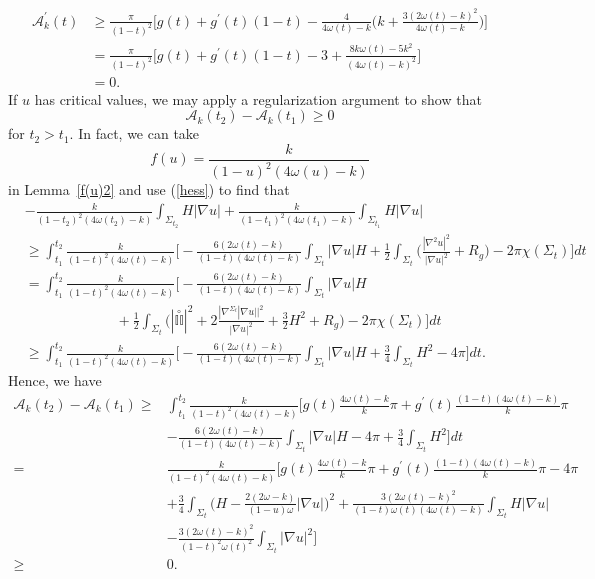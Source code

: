\documentclass[12pt]{article}
\theoremstyle{definition}
\theoremstyle{plain}
\numberwithin{equation}{section}
\begin{document}
$$
\begin{aligned}
\mathcal{A}_{k}^{\prime}(t)&\geq\frac{\pi}{(1-t)^{2}}\Big[g(t)+g^{\prime}(t)(1-t)-\frac{4}{4\omega(t)-k}\Big(k+\frac{3(2\omega(t)-k)^{2}}{4\omega(t)-k}\Big) \Big]\\
&=\frac{\pi}{(1-t)^{2}}\Big[g(t)+g^{\prime}(t)(1-t)-3+\frac{8k\omega(t)-5k^{2}}{(4\omega(t)-k)^{2}}\Big]\\
&=0.
\end{aligned}
$$
If $ u $ has critical values, we may apply a regularization argument to show that
$$
\mathcal{A}_{k}(t_{2})-\mathcal{A}_{k}(t_{1})\geq0
$$
for $ t_{2}>t_{1} $. In fact, we can take $$ f(u)=\frac{k}{(1-u)^{2}(4\omega(u)-k)} $$ in Lemma~\ref{f(u)2} and use (\ref{hess}) to find that
$$
\begin{aligned}
&-\frac{k}{(1-t_{2})^{2}(4\omega(t_{2})-k)}\int_{\Sigma_{t_{2}}}H|\nabla u|+\frac{k}{(1-t_{1})^{2}(4\omega(t_{1})-k)}\int_{\Sigma_{t_{1}}}H|\nabla u|\\
&\geq\int_{t_{1}}^{t_{2}}\frac{k}{(1-t)^{2}(4\omega(t)-k)}\Big[-\frac{6(2\omega(t)-k)}{(1-t)(4\omega(t)-k)}\int_{\Sigma_{t}}|\nabla u|H+\frac{1}{2}\int_{\Sigma_{t}}\Big(\frac{|\nabla^{2}u|^{2}}{|\nabla u|^{2}}+R_{g}\Big)-2\pi\chi(\Sigma_{t}) \Big]dt\\
&=\int_{t_{1}}^{t_{2}}\frac{k}{(1-t)^{2}(4\omega(t)-k)}\Big[-\frac{6(2\omega(t)-k)}{(1-t)(4\omega(t)-k)}\int_{\Sigma_{t}}|\nabla u|H\\
&\,\,\,\,\,\,\,\,\,\,\,\,\,\,\,\,\,\,\,\,\,\,\,\,\,\,\,\,\,\,\,\,\,\,\,\,\,\,\,+\frac{1}{2}\int_{\Sigma_{t}}\Big(|\overset{\circ}{\mathbb{II}}|^{2}+2\frac{|\nabla^{\Sigma_{t}}|\nabla u||^{2}}{|\nabla u|^{2}}+\frac{3}{2}H^{2}+R_{g}\Big)-2\pi\chi(\Sigma_{t}) \Big]dt\\
&\geq \int_{t_{1}}^{t_{2}}\frac{k}{(1-t)^{2}(4\omega(t)-k)}\Big[-\frac{6(2\omega(t)-k)}{(1-t)(4\omega(t)-k)}\int_{\Sigma_{t}}|\nabla u|H+\frac{3}{4}\int_{\Sigma_{t}}H^{2}-4\pi\Big]dt.
\end{aligned}
$$
Hence, we have
$$
\begin{aligned}
\mathcal{A}_{k}(t_{2})-\mathcal{A}_{k}(t_{1})\geq& \int_{t_{1}}^{t_{2}}\frac{k}{(1-t)^{2}(4\omega(t)-k)}\Big[g(t)\frac{4\omega(t)-k}{k}\pi+g^{\prime}(t)\frac{(1-t)(4\omega(t)-k)}{k}\pi\\
&-\frac{6(2\omega(t)-k)}{(1-t)(4\omega(t)-k)}\int_{\Sigma_{t}}|\nabla u|H-4\pi+\frac{3}{4}\int_{\Sigma_{t}}H^{2} \Big]dt\\
=&\frac{k}{(1-t)^{2}(4\omega(t)-k)}\Big[g(t)\frac{4\omega(t)-k}{k}\pi+g^{\prime}(t)\frac{(1-t)(4\omega(t)-k)}{k}\pi-4\pi\\
&+\frac{3}{4}\int_{\Sigma_{t}}\Big(H-\frac{2(2\omega-k)}{(1-u)\omega}|\nabla u|\Big)^{2}+\frac{3(2\omega(t)-k)^{2}}{(1-t)\omega(t)(4\omega(t)-k)}\int_{\Sigma_{t}}H|\nabla u|\\
&-\frac{3(2\omega(t)-k)^{2}}{(1-t)^{2}\omega(t)^{2}}\int_{\Sigma_{t}}|\nabla u|^{2}\Big]\\
\geq&0.
\end{aligned}
$$
\end{document}
